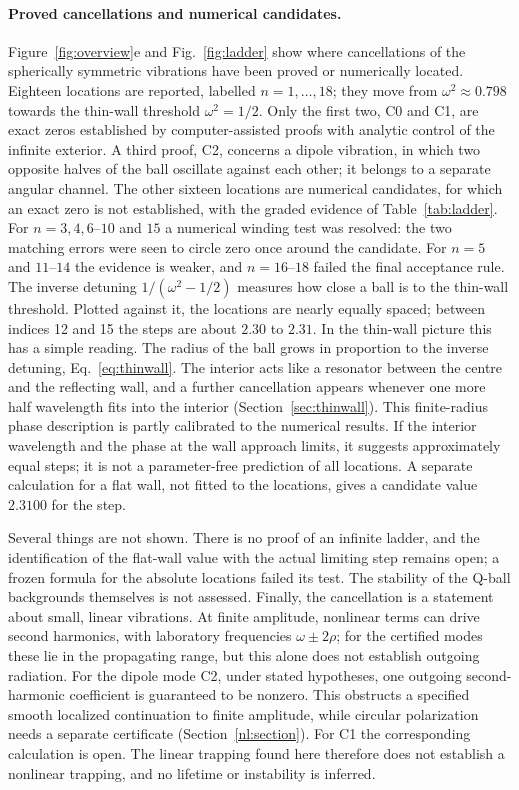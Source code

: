 \paragraph{Proved cancellations and numerical candidates.}
Figure~\ref{fig:overview}e and Fig.~\ref{fig:ladder} show where
cancellations of the spherically symmetric vibrations have been proved
or numerically located. Eighteen locations are reported, labelled
$n=1,\ldots,18$; they move from $\omega^2\approx0.798$ towards the
thin-wall threshold $\omega^2=1/2$. Only the first two, C0 and C1, are
exact zeros established by computer-assisted proofs with analytic control
of the infinite exterior. A third proof, C2, concerns a dipole vibration,
in which two opposite halves of the ball oscillate against each other;
it belongs to a separate angular channel. The other sixteen locations
are numerical candidates, for which an exact zero is not established,
with the graded evidence of Table~\ref{tab:ladder}. For $n=3,4,6$--$10$
and $15$ a numerical winding test was resolved: the two matching errors
were seen to circle zero once around the candidate. For $n=5$ and
$11$--$14$ the evidence is weaker, and $n=16$--$18$ failed the final
acceptance rule. The inverse detuning $1/(\omega^2-1/2)$ measures how
close a ball is to the thin-wall threshold. Plotted against it, the
locations are nearly equally spaced; between indices 12 and 15 the steps
are about $2.30$ to $2.31$. In the thin-wall picture this has a simple
reading. The radius of the ball grows in proportion to the inverse
detuning, Eq.~\eqref{eq:thinwall}. The interior acts like a resonator
between the centre and the reflecting wall, and a further cancellation
appears whenever one more half wavelength fits into the interior
(Section~\ref{sec:thinwall}). This finite-radius phase description is
partly calibrated to the numerical results. If the interior wavelength
and the phase at the wall approach limits, it suggests approximately
equal steps; it is not a parameter-free prediction of all locations.
A separate calculation for a flat wall, not fitted to the locations,
gives a candidate value $2.3100$ for the step.

Several things are not shown. There is no proof of an infinite
ladder, and the identification of the flat-wall value with the actual
limiting step remains open; a frozen formula for the absolute locations
failed its test. The stability of the Q-ball backgrounds themselves is
not assessed. Finally, the cancellation is a statement about small,
linear vibrations. At finite amplitude, nonlinear terms can drive second
harmonics, with laboratory frequencies $\omega\pm2\rho$; for the
certified modes these lie in the propagating range, but this alone does
not establish outgoing radiation. For the dipole mode C2, under stated
hypotheses, one outgoing second-harmonic coefficient is guaranteed to be
nonzero. This obstructs a specified smooth localized continuation to
finite amplitude, while circular polarization needs a separate
certificate (Section~\ref{nl:section}). For C1 the corresponding
calculation is open. The linear trapping found here therefore does not
establish a nonlinear trapping, and no lifetime or instability is
inferred.

